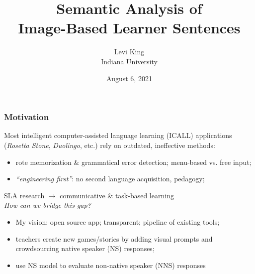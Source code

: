\documentclass[handout,xcolor={dvipsnames}]{beamer}
\title{Semantic Analysis of \\ Image-Based Learner Sentences}
\author[Levi King]{Levi King\\
Indiana University  }
\date{August 6, 2021}
\begin{document}
\maketitle
\begin{frame}
\frametitle{Motivation}
\pause
Most intelligent computer-assisted language learning (ICALL) applications (\textit{Rosetta Stone}, \textit{Duolingo}, etc.) rely on outdated, ineffective methods:
\begin{itemize}
\pause
\item rote memorization \& grammatical error detection; menu-based vs. free input;
\pause
\item \textit{``engineering first''}: no second language acquisition, pedagogy;
\end{itemize}
\pause
SLA research $\rightarrow$ communicative \& task-based learning \\

\pause
\vspace{1em}
\textit{How can we bridge this gap?}

\begin{itemize}
\pause
\item My vision: \pause open source app; transparent; pipeline of existing tools;
\pause
\item teachers create new games/stories by adding visual prompts and crowdsourcing native speaker (NS) responses;
\pause
\item use NS model to evaluate non-native speaker (NNS) responses
\end{itemize}
\end{frame}
\end{document}
